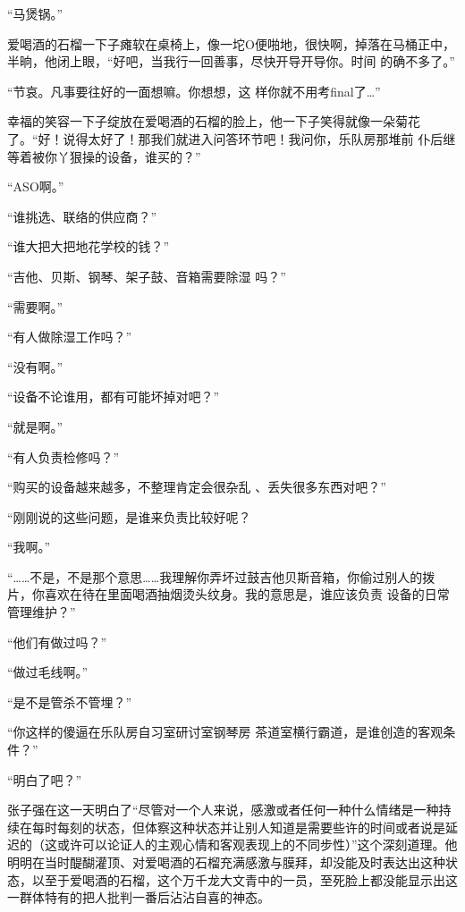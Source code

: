 \documentclass{article}
\begin{document}
“马煲锅。” 

爱喝酒的石榴一下子瘫软在桌椅上，像一坨O便啪地，很快啊，掉落在马桶正中，半晌，他闭上眼，“好吧，当我行一回善事，尽快开导开导你。时间
的确不多了。” 

“节哀。凡事要往好的一面想嘛。你想想，这
样你就不用考final了…” 

幸福的笑容一下子绽放在爱喝酒的石榴的脸上，他一下子笑得就像一朵菊花了。“好！说得太好了！那我们就进入问答环节吧！我问你，乐队房那堆前
仆后继等着被你丫狠操的设备，谁买的？” 


“ASO啊。” 


\newpage

“谁挑选、联络的供应商？” 



“谁大把大把地花学校的钱？” 


“吉他、贝斯、钢琴、架子鼓、音箱需要除湿
吗？” 


“需要啊。” 


“有人做除湿工作吗？” 


“没有啊。” 


“设备不论谁用，都有可能坏掉对吧？” 


“就是啊。” 


“有人负责检修吗？” 


\newpage

“购买的设备越来越多，不整理肯定会很杂乱
、丢失很多东西对吧？” 


“刚刚说的这些问题，是谁来负责比较好呢？


“我啊。” 

“……不是，不是那个意思……我理解你弄坏过鼓吉他贝斯音箱，你偷过别人的拨片，你喜欢在待在里面喝酒抽烟烫头纹身。我的意思是，谁应该负责
设备的日常管理维护？” 



“他们有做过吗？” 


“做过毛线啊。” 


“是不是管杀不管埋？” 


\newpage

“你这样的傻逼在乐队房自习室研讨室钢琴房
茶道室横行霸道，是谁创造的客观条件？” 



“明白了吧？” 

张子强在这一天明白了“尽管对一个人来说，感激或者任何一种什么情绪是一种持续在每时每刻的状态，但体察这种状态并让别人知道是需要些许的时间或者说是延迟的（这或许可以论证人的主观心情和客观表现上的不同步性）”这个深刻道理。他明明在当时醍醐灌顶、对爱喝酒的石榴充满感激与膜拜，却没能及时表达出这种状态，以至于爱喝酒的石榴，这个万千龙大文青中的一员，至死脸上都没能显示出这
一群体特有的把人批判一番后沾沾自喜的神态。 
\end{document}

